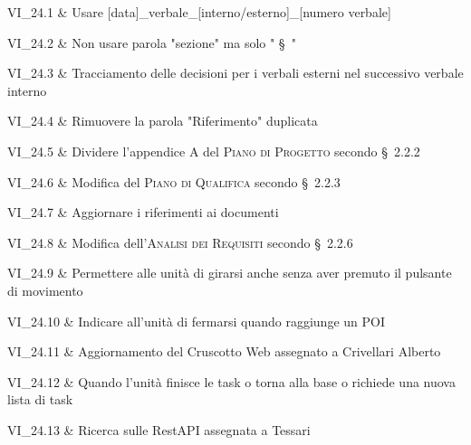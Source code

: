VI\_24.1 & Usare [data]\_verbale\_[interno/esterno]\_[numero verbale]

\tabularnewline
VI\_24.2 & Non usare parola "sezione" ma solo " \S\ "

\tabularnewline
VI\_24.3 & Tracciamento delle decisioni per i verbali esterni nel successivo verbale interno

\tabularnewline
VI\_24.4 & Rimuovere la parola "Riferimento" duplicata

\tabularnewline
VI\_24.5 & Dividere l'appendice A del \textsc{Piano di Progetto} secondo \S\ 2.2.2

\tabularnewline
VI\_24.6 & Modifica del \textsc{Piano di Qualifica} secondo \S\ 2.2.3

\tabularnewline
VI\_24.7 & Aggiornare i riferimenti ai documenti

\tabularnewline
VI\_24.8 & Modifica dell'\textsc{Analisi dei Requisiti} secondo \S\ 2.2.6

\tabularnewline
VI\_24.9 & Permettere alle unità di girarsi anche senza aver premuto il pulsante di movimento

\tabularnewline
VI\_24.10 & Indicare all'unità di fermarsi quando raggiunge un POI

\tabularnewline
VI\_24.11 & Aggiornamento del Cruscotto Web assegnato a Crivellari Alberto

\tabularnewline
VI\_24.12 & Quando l'unità finisce le task o torna alla base o richiede una nuova lista di task

\tabularnewline
VI\_24.13 & Ricerca sulle RestAPI assegnata a Tessari
